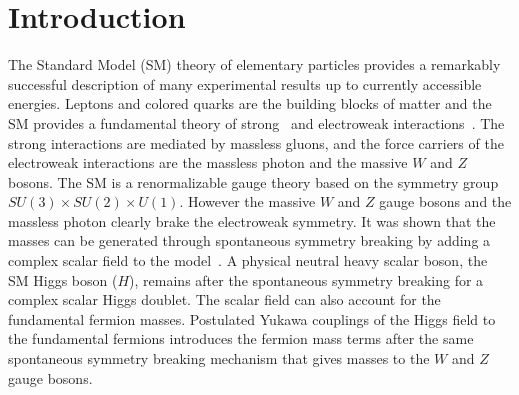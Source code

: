 \chapter{Introduction}

The Standard Model (SM) theory of elementary particles provides a remarkably successful description of many experimental results up to currently accessible energies. Leptons and colored quarks are the building blocks of matter and the SM provides a fundamental theory of strong~\cite{Politzer:1973fx,Gross:1973id} and electroweak interactions~\cite{Glashow:1961tr,Weinberg:1967tq,Salam:1968rm}. The strong interactions are mediated by massless gluons, and the force carriers of the electroweak interactions are the massless photon and the massive $W$ and $Z$ bosons. The SM is a renormalizable gauge theory based on the symmetry group $SU(3) \times SU(2) \times U(1)$. However the massive $W$ and $Z$ gauge bosons and the massless photon clearly brake the electroweak symmetry. It was shown that the masses can be generated through spontaneous symmetry breaking by adding a complex scalar field to the model~\cite{Englert:1964et,Higgs:1964ia,Higgs:1964pj,Guralnik:1964eu,Higgs:1966ev,Kibble:1967sv}. A physical neutral heavy scalar boson, the SM Higgs boson ($H$), remains after the spontaneous symmetry breaking for a complex scalar Higgs doublet. The scalar field can also account for the fundamental fermion masses. Postulated Yukawa couplings of the Higgs field to the fundamental fermions introduces the fermion mass terms after the same spontaneous symmetry breaking mechanism that gives masses to the $W$ and $Z$ gauge bosons. 

